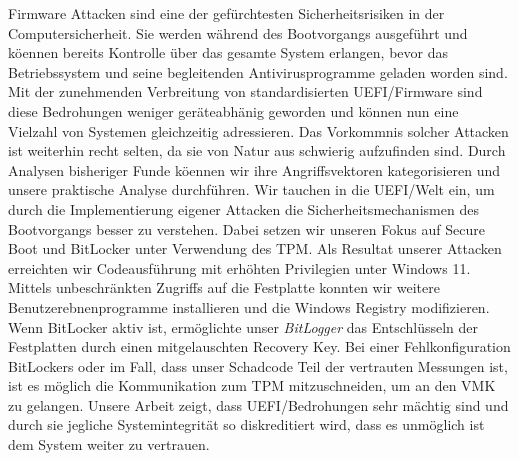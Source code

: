Firmware Attacken sind eine der gef\"urchtesten Sicherheitsrisiken in der Computersicherheit.
Sie werden w\"ahrend des Bootvorgangs ausgef\"uhrt und k\"oennen bereits Kontrolle \"uber das gesamte System erlangen, bevor das Betriebssystem und seine begleitenden Antivirusprogramme geladen worden sind.
Mit der zunehmenden Verbreitung von standardisierten \acf{UEFI}\-/Firmware sind diese Bedrohungen weniger ger\"ateabh\"anig geworden und k\"onnen nun eine Vielzahl von Systemen gleichzeitig adressieren.
Das Vorkommnis solcher Attacken ist weiterhin recht selten, da sie von Natur aus schwierig aufzufinden sind.
Durch Analysen bisheriger Funde k\"oennen wir ihre Angriffsvektoren kategorisieren und unsere praktische Analyse durchf\"uhren.
Wir tauchen in die \ac{UEFI}\-/Welt ein, um durch die Implementierung eigener Attacken die Sicherheitsmechanismen des Bootvorgangs besser zu verstehen.
Dabei setzen wir unseren Fokus auf Secure Boot und BitLocker unter Verwendung des \acf{TPM}.
Als Resultat unserer Attacken erreichten wir Codeausf\"uhrung mit erh\"ohten Privilegien unter Windows 11.
Mittels unbeschr\"ankten Zugriffs auf die Festplatte konnten wir weitere Benutzerebnenprogramme installieren und die Windows Registry modifizieren.
Wenn BitLocker aktiv ist, erm\"oglichte unser \emph{BitLogger} das Entschl\"usseln der Festplatten durch einen mitgelauschten Recovery Key.
Bei einer Fehlkonfiguration BitLockers oder im Fall, dass unser Schadcode Teil der vertrauten Messungen ist, ist es m\"oglich die Kommunikation zum \ac{TPM} mitzuschneiden, um an den \acf{VMK} zu gelangen.
Unsere Arbeit zeigt, dass \ac{UEFI}\-/Bedrohungen sehr m\"achtig sind und durch sie jegliche Systemintegrit\"at so diskreditiert wird, dass es unm\"oglich ist dem System weiter zu vertrauen.

\acresetall